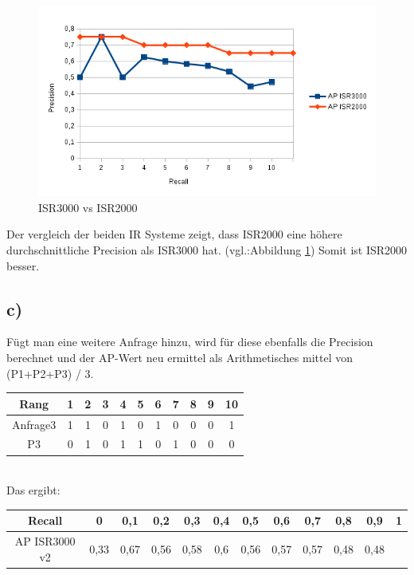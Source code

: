 \begin{figure}[H]
\centering
\includegraphics[width=0.7\linewidth]{./Aufgabe2/ir3vsir2}
\caption{ISR3000 vs ISR2000}
\label{fig:ir3vsir2}
\end{figure}

Der vergleich der beiden IR Systeme zeigt, dass ISR2000 eine höhere durchschnittliche Precision als ISR3000 hat. (vgl.:Abbildung \ref{fig:ir3vsir2})
Somit ist ISR2000 besser.

\subsection*{c)}
Fügt man eine weitere Anfrage hinzu, wird für diese ebenfalls die Precision berechnet und der AP-Wert neu ermittel als Arithmetisches mittel von (P1+P2+P3) / 3.

\begin{tabular}{|c|c|c|c|c|c|c|c|c|c|c|}
\hline Rang 	& 1 & 2  & 3  & 4  & 5  & 6  & 7  & 8  & 9  & 10 \\ 
\hline Anfrage3 & 1 & 1  & 0  & 1  & 0  & 1  & 0  & 0  & 0  & 1  \\ 
\hline P3 & 0 & 1  & 0  & 1  & 1  & 0  & 1  & 0  & 0  & 0 \\ 
\hline
\end{tabular}
\\
Das ergibt:
\\
\begin{tabular}{|c|c|c|c|c|c|c|c|c|c|c|c|}
\hline Recall 	  & 0    & 0,1  &  0,2 & 0,3 & 0,4 & 0,5 & 0,6 & 0,7  & 0,8  & 0,9  & 1 \\
\hline AP ISR3000 v2 & 0,33 & 0,67 & 0,56 & 0,58 & 0,6 & 0,56 & 0,57 & 0,57 & 0,48 & 0,48\\
\hline

\end{tabular}
\newpage